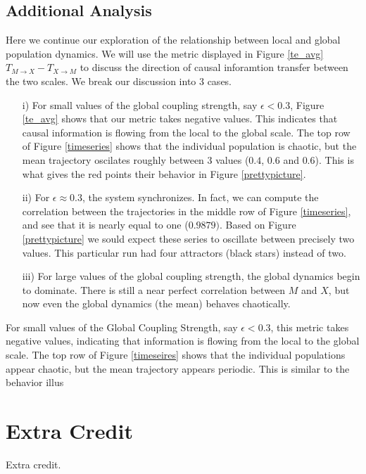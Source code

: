 \documentclass[conference]{IEEEtran}
\begin{document}
\subsection{Additional Analysis}
\noindent Here we continue our exploration of the relationship between local and global population dynamics. We will use the metric displayed in Figure \ref{te_avg} $T_{M\rightarrow X} - T_{X\rightarrow M}$ to discuss the direction of causal inforamtion transfer between the two scales. We break our discussion into 3 cases.
\begin{itemize}
\item[i)] For small values of the global coupling strength, say $\epsilon < 0.3$, Figure \ref{te_avg} shows that our metric takes negative values. This indicates that causal information is flowing from the local to the global scale. The top row of Figure \ref{timeseries} shows that the individual population is chaotic, but the mean trajectory oscilates roughly between 3 values ($0.4$, $0.6$ and $0.6$). This is what gives the red points their behavior in Figure \ref{prettypicture}.
\item[ii)] For $\epsilon \approx 0.3$, the system synchronizes. In fact, we can compute the correlation between the trajectories in the middle row of Figure \ref{timeseries}, and see that it is nearly equal to one ($0.9879)$. Based on Figure \ref{prettypicture} we sould expect these series to oscillate between precisely two values. This particular run had four attractors (black stars) instead of two.
\item[iii)] For large values of the global coupling strength, the global dynamics begin to dominate. There is still a near perfect correlation between $M$ and $X$, but now even the global dynamics (the mean) behaves chaotically.
\end{itemize}
For small values of the Global Coupling Strength, say $\epsilon < 0.3$, this metric takes negative values, indicating that information is flowing from the local to the global scale. The top row of Figure \ref{timeseires} shows that the individual populations appear chaotic, but the mean trajectory appears periodic. This is similar to the behavior illus



\section{Extra Credit}  Extra credit.  




\end{document}
